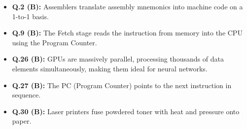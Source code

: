 \begin{expbox}
\begin{itemize}[leftmargin=5mm]
    \item \textbf{Q.2 (B):} Assemblers translate assembly mnemonics into machine code on a 1-to-1 basis.
    \item \textbf{Q.9 (B):} The Fetch stage reads the instruction from memory into the CPU using the Program Counter.
    \item \textbf{Q.26 (B):} GPUs are massively parallel, processing thousands of data elements simultaneously, making them ideal for neural networks.
    \item \textbf{Q.27 (B):} The PC (Program Counter) points to the next instruction in sequence.
    \item \textbf{Q.30 (B):} Laser printers fuse powdered toner with heat and pressure onto paper.
\end{itemize}
\end{expbox}

\newpage
